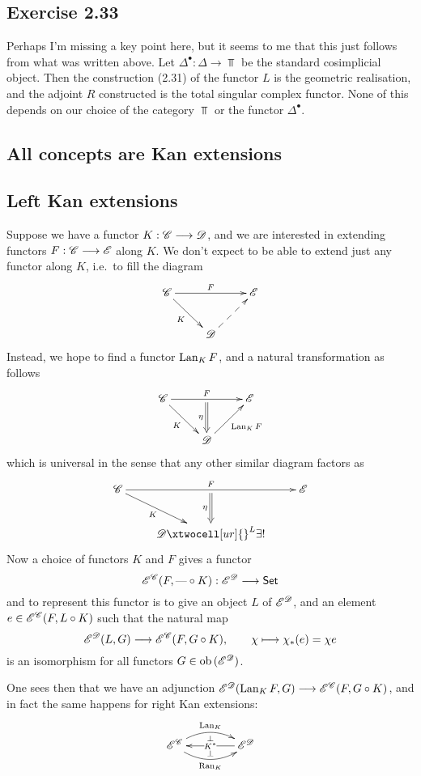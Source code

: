 \documentclass[11pt]{article}
\begin{document}
\begin{solutions}
\subsection*{Exercise 2.33}
Perhaps I'm missing a key point here, but it seems to me that this just follows from what was written above. Let $\Delta^\bullet:\Delta\to\Top$ be the standard cosimplicial object. Then the construction (2.31) of the functor $L$ is the geometric realisation, and the adjoint $R$ constructed is the total singular complex functor. None of this depends on our choice of the category $\Top$ or the functor $\Delta^\bullet$.

\end{solutions}
\begin{2. Kan Extensions}
\section*{All concepts are Kan extensions}
\subsection*{Left Kan extensions}
Suppose we have a functor $K:\mathscr{C}\longrightarrow\mathscr{D}$, and we are interested in extending functors $F:\mathscr{C}\longrightarrow\mathscr{E}$ along $K$. We don't expect to be able to extend just any functor along $K$, i.e.\ to fill the diagram
\[\xymatrix{
\scrC\ar[rr]^-{F}_-{}="1" \ar[rd]_-{K}&%
&%
\scrE\\%
&%
\scrD\ar@{-->}[ru]&%
}\]
Instead, we hope to find a functor $\operatorname{Lan}_KF$, and a natural transformation as follows
\[\xymatrix{
\scrC
\ar[rd]_-{K}\ar[rr]^-{F}_-{}="arF"&%
&%
\scrE\\%
&%
\scrD\ar@{->}[ur]_{\Lan_KF}\ar@{=>}"arF";[]_-{\eta}&%
}\]
which is universal in the sense that any other similar diagram factors as
\[\xymatrix{
\scrC
\ar[rd]_-{K}\ar[rr]^-{F}_-{}="arF"&%
&%
\scrE\\%
&%
\scrD\ar@{=>}"arF";[]_-{\eta}
\xtwocell[ur]{}^{L}{{\exists!}}&%
}\]
Now a choice of functors $K$ and $F$ gives a functor 
\[\mathscr{E}^{\mathscr{C}}(F,\textup{---}\circ K):\mathscr{E}^{\mathscr{D}}\longrightarrow\operatorname{{\mathsf{Set}}}\]
and to represent this functor is to give an object $L$ of $\mathscr{E}^{\mathscr{D}}$, and an element $e\in \mathscr{E}^{\mathscr{C}}(F,L\circ K)$ such that the natural map
\[\mathscr{E}^{\mathscr{D}}(L,G)\longrightarrow \mathscr{E}^{\mathscr{C}}(F,G\circ K),\qquad \chi\longmapsto \chi_*(e)=\chi e\]
is an isomorphism for all functors $G\in\textup{ob}\,(\mathscr{E}^{\mathscr{D}})$.

One sees then that we have an adjunction $\mathscr{E}^{\mathscr{D}}(\operatorname{Lan}_KF,G)\longrightarrow \mathscr{E}^{\mathscr{C}}(F,G\circ K)$, and in fact the same happens for right Kan extensions:
\[\xymatrix@C=1.5cm{
\scrE^\scrC
\ar@/^1.2em/[r]^-{\Lan_K}_-{\perp} \ar@/_1.2em/[r]_-{\Ran_K}^-{\perp}&%
\scrE^\scrD\ar[l]|{K^*}%
}\]

\end{2. Kan Extensions}
\end{document}
